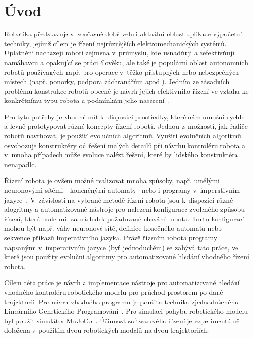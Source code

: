 \chapter{Úvod}




Robotika představuje v~současné době velmi aktuální oblast aplikace výpočetní techniky, jejímž cílem je řízení nejrůznějších
elektromechanických systémů.
Uplatnění nacházejí roboti zejména v~průmyslu, kde usnadňují a zefektivňují namáhavou a
opakující se práci člověku, ale také je populární oblast autonomních robotů používaných např. pro operace v~těžko přístupných
nebo nebezpečných místech (např. ponorky, podpora záchranářům apod.).
Jedním ze zásadních problémů konstrukce robotů obecně je návrh jejich efektivního řízení ve vztahu ke konkrétnímu typu robota a podmínkám jeho nasazení~\cite{Bongard2013}.

Pro tyto potřeby je vhodné mít k~dispozici prostředky, které nám umožní rychle a levně prototypovat různé koncepty řízení
robotů.
Jednou z~možností, jak řadiče robotů navrhovat, je použití evolučních algoritmů.
Využití evolučních algoritmů osvobozuje konstruktéry od řešení malých detailů při návrhu kontroléru robota a v~mnoha případech může evoluce nalézt řešení, které by lidského konstruktéra nenapadlo.

Řízení robota je ovšem možné realizovat mnoha způsoby, např. umělými neuronovými sítěmi~\cite{Reil2002}, konenčnými automaty~\cite{Hodgins1996} nebo i programy v~imperativním jazyce~\cite{Wolff2007}.
V~závislosti na vybrané metodě řízení robota jsou k~dispozici různé alogritmy a automatizované nástroje pro nalezení konfigurace zvoleného způsobu řízení, které bude mít za následek požadované chování robota.
Touto konfigurací mohou být např. váhy neuronové sítě, definice konečného automatu nebo sekvence příkazů imperativního jazyka.
Právě řízením robota programy napsanými v~imperativním jazyce (byť jednoduchém) se zabývá tato práce, ve které jsou použity evoluční algoritmy pro automatizované hledání vhodného řízení robota.

Cílem této práce je návrh a implementace nástroje pro automatizované hledání vhodného kontroléru robotického modelu pro průchod prostorem po dané trajektorii.
Pro návrh vhodného programu je použita technika zjednodušeného Lineárního Genetického Programování~\cite{Brameier2010}.
Pro simulaci pohybu robotického modelu byl použit simulátor MuJoCo~\cite{Todorov2012}.
Účinnost softwarového řízení je experimentálně doložena s~použitím dvou robotických modelů na dvou trajektoriích.

